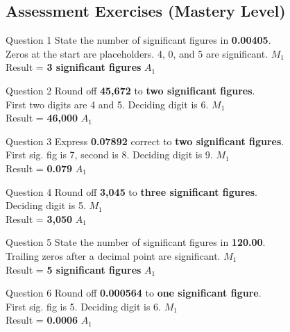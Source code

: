 \documentclass[12pt, a4paper, oneside]{article}
\begin{document}
\subsection*{Assessment Exercises (Mastery Level)}

\begin{solvingbox}{Question 1}
State the number of significant figures in \textbf{0.00405}. \\
Zeros at the start are placeholders. 4, 0, and 5 are significant. \hfill $M_1$ \\
Result = \textbf{3 significant figures} \hfill $A_1$
\end{solvingbox}

\begin{solvingbox}{Question 2}
Round off \textbf{45,672} to \textbf{two significant figures}. \\
First two digits are 4 and 5. Deciding digit is 6. \hfill $M_1$ \\
Result = \textbf{46,000} \hfill $A_1$
\end{solvingbox}

\begin{solvingbox}{Question 3}
Express \textbf{0.07892} correct to \textbf{two significant figures}. \\
First sig. fig is 7, second is 8. Deciding digit is 9. \hfill $M_1$ \\
Result = \textbf{0.079} \hfill $A_1$
\end{solvingbox}

\begin{solvingbox}{Question 4}
Round off \textbf{3,045} to \textbf{three significant figures}. \\
Deciding digit is 5. \hfill $M_1$ \\
Result = \textbf{3,050} \hfill $A_1$
\end{solvingbox}

\begin{solvingbox}{Question 5}
State the number of significant figures in \textbf{120.00}. \\
Trailing zeros after a decimal point are significant. \hfill $M_1$ \\
Result = \textbf{5 significant figures} \hfill $A_1$
\end{solvingbox}

\begin{solvingbox}{Question 6}
Round off \textbf{0.000564} to \textbf{one significant figure}. \\
First sig. fig is 5. Deciding digit is 6. \hfill $M_1$ \\
Result = \textbf{0.0006} \hfill $A_1$
\end{solvingbox}
\end{document}
